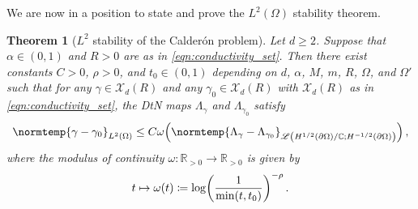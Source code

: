 \documentclass[pdflatex,sn-mathphys-num]{sn-jnl-preprint}
\let\originalleft\left %
\let\originalright\right
\renewcommand{\left}{\mathopen{}\mathclose\bgroup\originalleft}
\renewcommand{\right}{\aftergroup\egroup\originalright}
\newcommand{\R}{\mathbb{R}}
\newcommand{\C}{\mathbb{C}}
\newcommand{\cX}{\mathcal{X}}
\newcommand{\sL}{\mathscr{L}}
\newcommand{\pOmega}{{\partial\Omega}}
\newcommand{\dtn}{\Lambda_{\gamma}}
\newcommand{\dtnz}{\Lambda_{\gamma_0}}
\newcommand{\norm}{\normtemp}
\newcommand{\defeq}{\coloneqq} %
\newcommand{\al}{\alpha}
\theoremstyle{thmstyleone}%
\newtheorem{theorem}{Theorem}[section]%
\theoremstyle{thmstyletwo}%
\theoremstyle{thmstylethree}%
\numberwithin{equation}{section}
\numberwithin{theorem}{section}
\begin{document}
We are now in a position to state and prove the $L^2(\Omega)$ stability theorem.
\begin{theorem}[$L^2$ stability of the Calder\'on problem]\label{thm:stability}
    Let $d\geq 2$. Suppose that $\al\in(0,1)$ and $R>0$ are as in \eqref{eqn:conductivity_set}. Then there exist constants $C>0$, $\rho>0$, and $t_0\in (0,1)$ depending on $d$, $\al$, $M$, $m$, $R$, $\Omega$, and $\Omega'$ such that for any $\gamma\in\cX_d(R)$ and any $\gamma_0\in\cX_d(R)$ with $\cX_d(R)$ as in \eqref{eqn:conductivity_set}, the DtN maps $\dtn$ and $\dtnz$ satisfy
    \begin{align}\label{eqn:stability_log}
        \norm{\gamma-\gamma_0}_{L^2(\Omega)} \leq C \omega\Bigl(\norm{\Lambda_{\gamma} - \Lambda_{\gamma_0}}_{\sL\left(H^{1/2}(\pOmega)/\C;H^{-1/2}(\pOmega)\right)}\Bigr)\,,
    \end{align}
    where the modulus of continuity $\omega\colon \R_{>0}\to\R_{>0}$ is given by
    \begin{align}\label{eqn:modulus_log}
        t\mapsto \omega(t)\defeq \log\left(\frac{1}{\min(t,t_0)}\right)^{-\rho}\,. 
    \end{align}
\end{theorem}
\end{document}
